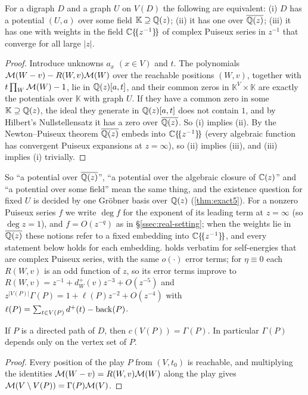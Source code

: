 \begin{lemma}\label{lem:field-independence}
For a digraph $D$ and a graph $U$ on $V(D)$ the following are equivalent: \textup{(i)} $D$ has a potential $(U,a)$ over some field $\mathbb K\supseteq\mathbb{Q}(z)$; \textup{(ii)} it has one over $\overline{\mathbb{Q}(z)}$; \textup{(iii)} it has one with weights in the field $\mathbb{C}\{\!\{z^{-1}\}\!\}$ of complex Puiseux series in $z^{-1}$ that converge for all large $|z|$.
\end{lemma}
\begin{proof}
Introduce unknowns $a_x$ $(x\in V)$ and $t$. The polynomials $\mathcal{M}(W-v)-R(W,v)\mathcal{M}(W)$ over the reachable positions $(W,v)$, together with $t\prod_W\mathcal{M}(W)-1$, lie in $\mathbb{Q}(z)[a,t]$, and their common zeros in $\mathbb K^{V}\times\mathbb K$ are exactly the potentials over $\mathbb K$ with graph $U$. If they have a common zero in some $\mathbb K\supseteq\mathbb{Q}(z)$, the ideal they generate in $\mathbb{Q}(z)[a,t]$ does not contain $1$, and by Hilbert's Nullstellensatz it has a zero over $\overline{\mathbb{Q}(z)}$. So (i) implies (ii). By the Newton--Puiseux theorem $\overline{\mathbb{Q}(z)}$ embeds into $\mathbb{C}\{\!\{z^{-1}\}\!\}$ (every algebraic function has convergent Puiseux expansions at $z=\infty$), so (ii) implies (iii), and (iii) implies (i) trivially.
\end{proof}

So ``a potential over $\overline{\mathbb{Q}(z)}$'', ``a potential over the algebraic closure of $\mathbb{C}(z)$'' and ``a potential over some field'' mean the same thing, and the existence question for fixed $U$ is decided by one Gr\"obner basis over $\mathbb{Q}(z)$ (\cref{thm:exact5}). For a nonzero Puiseux series $f$ we write $\deg f$ for the exponent of its leading term at $z=\infty$ (so $\deg z=1$), and $f=O(z^{-q})$ as in \S\ref{ssec:real-setting}; when the weights lie in $\overline{\mathbb{Q}(z)}$ these notions refer to a fixed embedding into $\mathbb{C}\{\!\{z^{-1}\}\!\}$, and every statement below holds for each embedding.  holds verbatim for self-energies that are complex Puiseux series, with the same $o(\cdot)$ error terms; for $\eta\equiv0$ each $R(W,v)$ is an odd function of $z$, so its error terms improve to $R(W,v)=z^{-1}+d^{+}_W(v)z^{-3}+O(z^{-5})$ and $z^{|V(P)|}\Gamma(P)=1+\ell(P)z^{-2}+O(z^{-4})$ with $\ell(P)=\sum_{t\in V(P)}d^{+}(t)-\operatorname{back}(P)$.

\begin{lemma}[telescoping]\label{lem:telescoping}
If $P$ is a directed path of $D$, then $c(V(P))=\Gamma(P)$. In particular $\Gamma(P)$ depends only on the vertex set of $P$.
\end{lemma}
\begin{proof}
Every position of the play $P$ from $(V,t_0)$ is reachable, and multiplying the identities $\mathcal{M}(W-v)=R(W,v)\mathcal{M}(W)$ along the play gives $\mathcal{M}(V\setminus V(P))=\Gamma(P)\mathcal{M}(V)$.
\end{proof}

